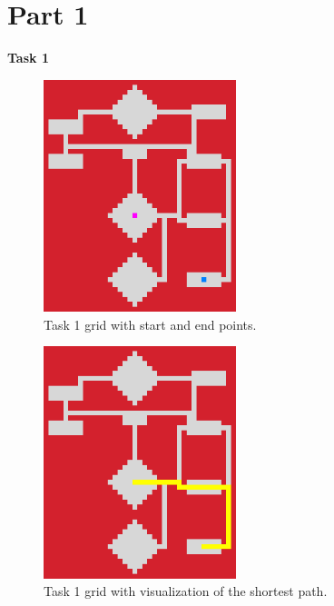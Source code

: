\documentclass{article}
\begin{document}
    \mainmatter

    \section*{Part 1}

    \textbf{Task 1}

    \begin{figure}[H]
        \centering
        \includegraphics[width=0.5\textwidth]{Images/p1t1_start.png}
        \caption[Task 1 startgrid]{Task 1 grid with start and end points.}
        \label{fig:Task 1 startgrid}
    \end{figure}

    \begin{figure}[H]
        \centering
        \includegraphics[width=0.5\textwidth]{Images/t1p1_finish.png}
        \caption[Task 1 endgrid]{Task 1 grid with visualization of the shortest path.}
        \label{fig:Task 1 endgrid}
    \end{figure}
\end{document}
